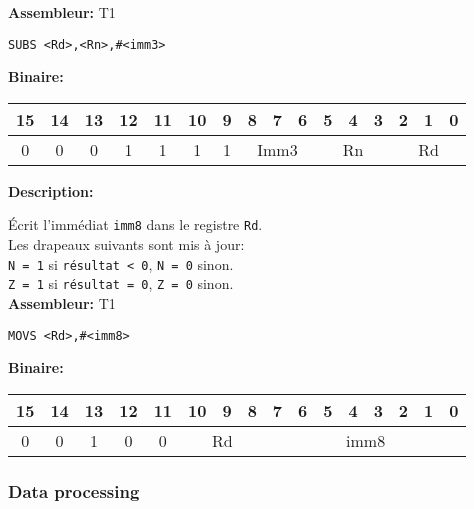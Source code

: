 \textbf{Assembleur:} T1

\begin{lstlisting}
SUBS <Rd>,<Rn>,#<imm3>
\end{lstlisting}

\textbf{Binaire:}\\

\begin{tabular}{| c c c c c c c c c c c c c c c c |}
\hline
15 & 14 & 13 & \multicolumn{1}{|c}{12} & 11 & \multicolumn{1}{|c}{10} & \multicolumn{1}{|c}{9} & \multicolumn{1}{|c}{8} & 7 & 6 & \multicolumn{1}{|c}{5} & 4 & 3 & \multicolumn{1}{|c}{2} & 1 & 0 \\
\hline   
0 & 0 & 0 & \multicolumn{1}{|c}{1} & 1 &  \multicolumn{1}{|c}{1} & \multicolumn{1}{|c}{1} & \multicolumn{3}{|c|}{Imm3} & \multicolumn{3}{|c|}{Rn} & \multicolumn{3}{|c|}{Rd} \\
\hline
\end{tabular}



\textbf{Description: }

Écrit l'immédiat \texttt{imm8} dans le registre \texttt{Rd}.\\
Les drapeaux suivants sont mis à jour:\\
\texttt{N = 1} si \texttt{résultat < 0}, \texttt{N = 0} sinon.\\
\texttt{Z = 1} si \texttt{résultat = 0}, \texttt{Z = 0} sinon.\\

\textbf{Assembleur:} T1

\begin{lstlisting}
MOVS <Rd>,#<imm8>
\end{lstlisting}

\textbf{Binaire:}\\

\begin{tabular}{| c c c c c c c c c c c c c c c c |}
\hline
15 & 14 & 13 & \multicolumn{1}{|c}{12} & 11 & \multicolumn{1}{|c}{10} & 9 & 8 & \multicolumn{1}{|c}{7} & 6 & 5 & 4 & 3 & 2 & 1 & 0 \\
\hline
0 & 0 & 1 & \multicolumn{1}{|c}{0} & 0 & \multicolumn{3}{|c|}{Rd} & \multicolumn{8}{|c|}{imm8} \\
\hline
\end{tabular}


\subsubsection{Data processing}
\label{subsubsec:DataProc}

